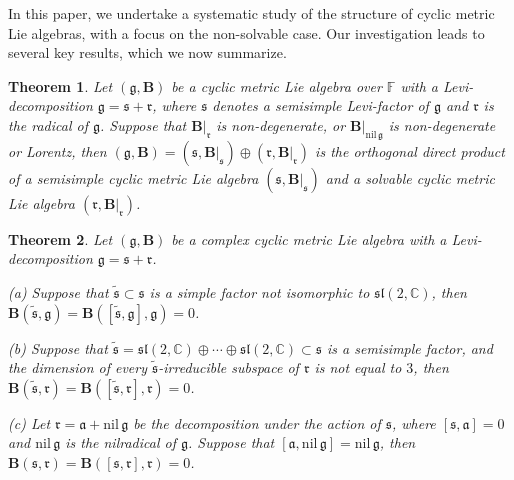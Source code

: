 \documentclass[reqno]{amsart}
\newtheorem{thm}{Theorem}[section]
\theoremstyle{definition}
\begin{document}
In this paper, we undertake a systematic study of the structure of cyclic metric Lie algebras, with a focus on the non-solvable case. Our investigation leads to several key results, which we now summarize.
\begin{thm}\label{1-thm-main1.5}
Let  $(\mathfrak{g},\mathbf{B})$ be a  cyclic metric Lie algebra over $\mathbb{F}$ with   a Levi-decomposition $\mathfrak{g}=\mathfrak{s}+\mathfrak{r}$, where $\mathfrak{s}$ denotes a semisimple Levi-factor of $\mathfrak{g}$ and $\mathfrak{r}$ is the radical of $\mathfrak{g}$.
Suppose that $\mathbf{B}|_{\mathfrak{r}}$ is non-degenerate,
or $\mathbf{B}|_{\mathrm{nil}\,\mathfrak{g}}$  is non-degenerate or Lorentz, then $(\mathfrak{g},\mathbf{B})=(\mathfrak{s},\mathbf{B}|_{\mathfrak{s}})\oplus(\mathfrak{r},\mathbf{B}|_{\mathfrak{r}})$
  is the orthogonal direct product of a semisimple cyclic metric Lie algebra
$(\mathfrak{s},\mathbf{B}|_{\mathfrak{s}})$
 and a solvable cyclic metric Lie algebra $(\mathfrak{r},\mathbf{B}|_{\mathfrak{r}})$.
\end{thm}
\begin{thm}\label{1-thm-main2}
Let  $(\mathfrak{g},\mathbf{B})$ be a complex  cyclic metric Lie algebra with a Levi-decomposition $\mathfrak{g}=\mathfrak{s}+\mathfrak{r}$.

(a) Suppose that $\tilde{\mathfrak{s}}\subset \mathfrak{s}$ is a simple factor  not isomorphic to $\mathfrak{sl}(2,\mathbb{C})$, then $\mathbf{B}(\tilde{\mathfrak{s}},\mathfrak{g})=\mathbf{B}([\tilde{\mathfrak{s}},\mathfrak{g}],\mathfrak{g})=0$.

(b)  Suppose that $\tilde{\mathfrak{s}}=\mathfrak{sl}(2,\mathbb{C})\oplus\cdots\oplus\mathfrak{sl}(2,\mathbb{C})\subset \mathfrak{s}$ is a semisimple factor,
 and the dimension of every $\tilde{\mathfrak{s}}$-irreducible subspace of  $\mathfrak{r}$ is not equal to $3$,  then $\mathbf{B}(\tilde{\mathfrak{s}},\mathfrak{r})=\mathbf{B}([\tilde{\mathfrak{s}},\mathfrak{r}],\mathfrak{r})=0$.

 (c) Let $\mathfrak{r}=\mathfrak{a}+\mathrm{nil}\,\mathfrak{g}$ be the decomposition under the action of $\mathfrak{s}$, where $[\mathfrak{s},\mathfrak{a}]=0$ and $\mathrm{nil}\,\mathfrak{g}$ is the nilradical of $\mathfrak{g}$.
 Suppose that $[\mathfrak{a},\mathrm{nil}\,\mathfrak{g}]=\mathrm{nil}\,\mathfrak{g}$,
 then $\mathbf{B}(\mathfrak{s},\mathfrak{r})=\mathbf{B}([\mathfrak{s},\mathfrak{r}],\mathfrak{r})=0$.
\end{thm}
\end{document}

